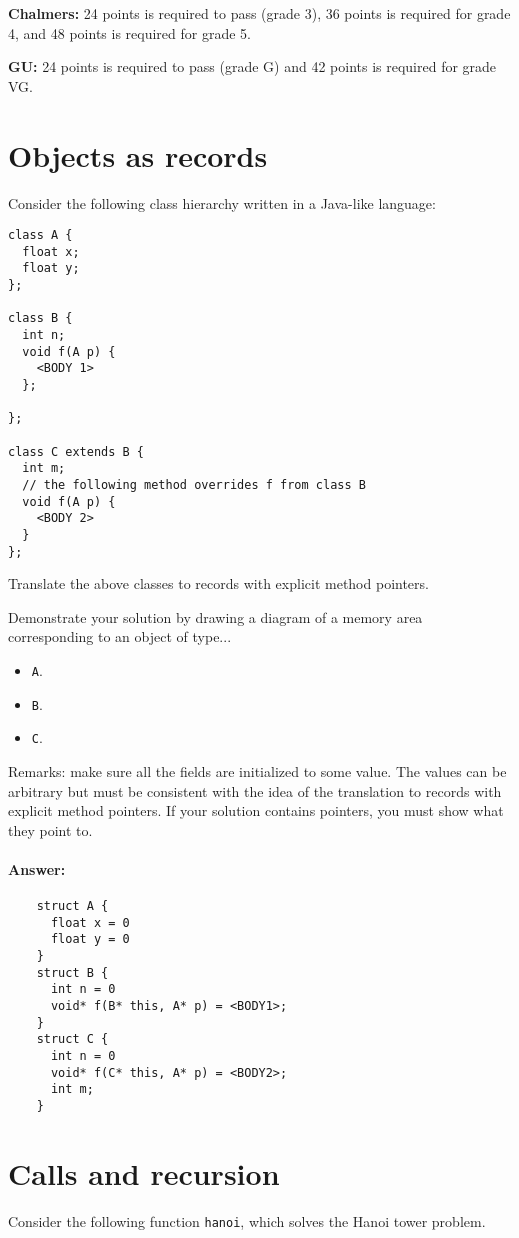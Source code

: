 \documentclass{article}
\newcommand{\answer}[0]{\paragraph{Answer:}}
\begin{document}
\textbf{Chalmers:}
24 points is required to pass (grade 3), 36 points is required for
grade 4, and 48 points is required for grade 5.

\textbf{GU:}
24 points is required to pass (grade G) and 42 points is
required for grade VG.

\section{Objects as records}

Consider the following class hierarchy written in a Java-like
language:
\begin{verbatim}
class A {
  float x;
  float y;
};

class B {
  int n;
  void f(A p) {
    <BODY 1>
  };

};

class C extends B {
  int m;
  // the following method overrides f from class B
  void f(A p) { 
    <BODY 2>
  }
};
\end{verbatim}

Translate the above classes to records with explicit method pointers.

Demonstrate your solution by drawing a diagram of a memory area
corresponding to an object of type...
\begin{itemize}
\item \texttt A. 
\item \texttt B. 
\item \texttt C. 
\end{itemize}
Remarks: make sure all the fields are initialized to some value. The
values can be arbitrary but must be consistent with the idea of the
translation to records with explicit method pointers. If your solution
contains pointers, you must show what they point to.

\answer{
\begin{verbatim}
    struct A {
      float x = 0
      float y = 0
    }
    struct B {
      int n = 0
      void* f(B* this, A* p) = <BODY1>;
    }
    struct C {
      int n = 0
      void* f(C* this, A* p) = <BODY2>;
      int m;
    }
\end{verbatim}
}

\newpage
\section{Calls and recursion}

Consider the following function \texttt{hanoi},
which solves the Hanoi tower problem.
\end{document}
